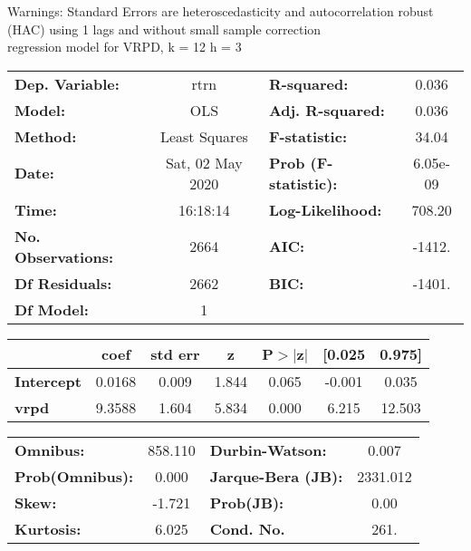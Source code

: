 Warnings: \newline
 [1] Standard Errors are heteroscedasticity and autocorrelation robust (HAC) using 1 lags and without small sample correction\\ 

regression model for VRPD, k = 12 h = 3\begin{center}
\begin{tabular}{lclc}
\toprule
\textbf{Dep. Variable:}    &       rtrn       & \textbf{  R-squared:         } &     0.036   \\
\textbf{Model:}            &       OLS        & \textbf{  Adj. R-squared:    } &     0.036   \\
\textbf{Method:}           &  Least Squares   & \textbf{  F-statistic:       } &     34.04   \\
\textbf{Date:}             & Sat, 02 May 2020 & \textbf{  Prob (F-statistic):} &  6.05e-09   \\
\textbf{Time:}             &     16:18:14     & \textbf{  Log-Likelihood:    } &    708.20   \\
\textbf{No. Observations:} &        2664      & \textbf{  AIC:               } &    -1412.   \\
\textbf{Df Residuals:}     &        2662      & \textbf{  BIC:               } &    -1401.   \\
\textbf{Df Model:}         &           1      & \textbf{                     } &             \\
\bottomrule
\end{tabular}
\begin{tabular}{lcccccc}
                   & \textbf{coef} & \textbf{std err} & \textbf{z} & \textbf{P$> |$z$|$} & \textbf{[0.025} & \textbf{0.975]}  \\
\midrule
\textbf{Intercept} &       0.0168  &        0.009     &     1.844  &         0.065        &       -0.001    &        0.035     \\
\textbf{vrpd}      &       9.3588  &        1.604     &     5.834  &         0.000        &        6.215    &       12.503     \\
\bottomrule
\end{tabular}
\begin{tabular}{lclc}
\textbf{Omnibus:}       & 858.110 & \textbf{  Durbin-Watson:     } &    0.007  \\
\textbf{Prob(Omnibus):} &   0.000 & \textbf{  Jarque-Bera (JB):  } & 2331.012  \\
\textbf{Skew:}          &  -1.721 & \textbf{  Prob(JB):          } &     0.00  \\
\textbf{Kurtosis:}      &   6.025 & \textbf{  Cond. No.          } &     261.  \\
\bottomrule
\end{tabular}
\end{center}

